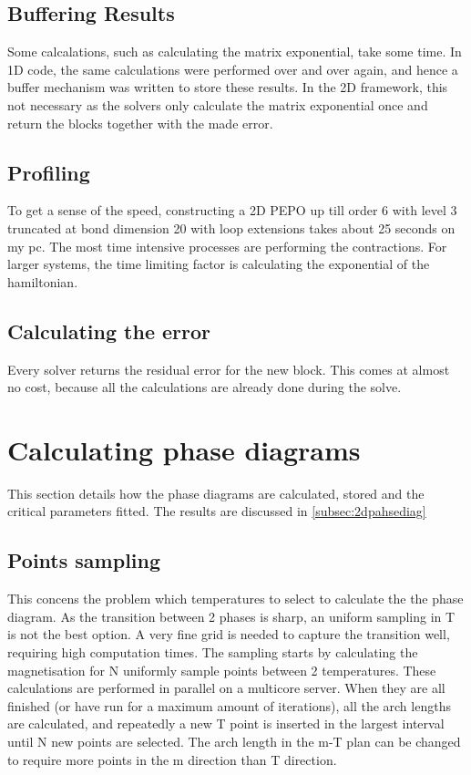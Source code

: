 \subsection{Buffering Results}

Some calcalations, such as calculating the matrix exponential, take some time. In 1D code, the same calculations were performed over and over again, and hence a buffer mechanism was written to store these results. In the 2D framework, this not necessary as the solvers only calculate the matrix exponential once and return the blocks together with the made error.

\subsection{Profiling}
To get a sense of the speed, constructing a 2D PEPO up till order 6 with level 3 truncated at bond dimension 20 with loop extensions takes about 25 seconds on my pc. The most time intensive processes are performing the contractions. For larger systems, the time limiting factor is calculating the exponential of the hamiltonian. 

\subsection{Calculating the error}

Every solver returns the residual error for the new block. This comes at almost no cost, because all the calculations are already done during the solve.


\section{Calculating phase diagrams} \label{sec:phase_diag}

This section details how the phase diagrams are calculated, stored and the critical parameters fitted. The results are discussed in \cref{subsec:2dpahsediag}

\subsection{Points sampling}

This concens the problem which temperatures to select to calculate the the phase diagram. As  the transition between 2 phases is sharp, an uniform sampling in T is not the best option. A very fine grid is needed to capture the transition well, requiring high computation times.
The sampling starts by calculating the magnetisation for N  uniformly sample points between 2 temperatures. These calculations are performed in parallel on a multicore server. When they are all finished (or have run for a maximum amount of iterations), all the arch lengths are calculated, and repeatedly a new T point is inserted in the largest interval until N new points are selected. The arch length in the m-T plan can be changed to require more points in the m direction than T direction.

